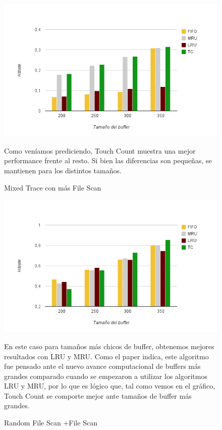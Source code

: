 \begin{figure}[ht] %
\includegraphics[scale=.80]{grafico1-1}
\caption{Mixed Trace con más File Scan}
Como veníamos prediciendo, Touch Count muestra una mejor performance frente al resto. 
Si bien las diferencias son pequeñas, se mantienen para los distintos tamaños.
\end{figure}

\begin{figure}[ht]
\includegraphics[scale=.80]{grafico1-2}
\caption{Random File Scan +File Scan}
En este caso para tamaños más chicos de buffer, obtenemos mejores resultados con LRU y MRU. 
Como el paper indica, este algoritmo fue pensado ante el nuevo avance computacional
de buffers más grandes comparado cuando se empezaron a utilizar los algoritmos LRU y MRU, por lo 
que es lógico que, tal como vemos en el gráfico, Touch Count se comporte mejor ante tamaños de buffer más grandes.
\end{figure}

